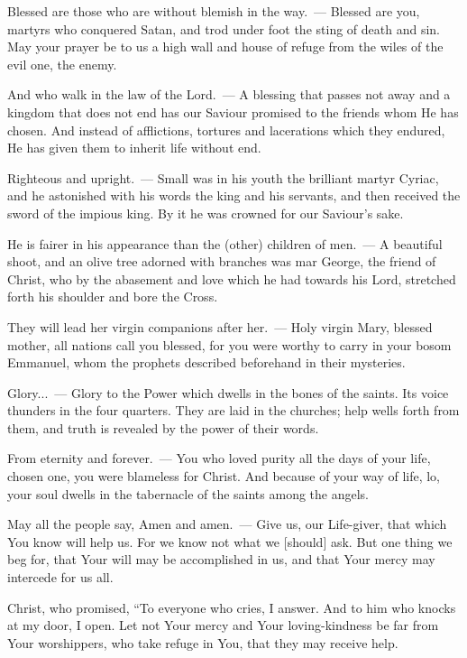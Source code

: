 \documentclass[12pt,twoside,a5paper]{article}
\begin{document}
\begin{halfparskip}
  Blessed are those who are without blemish in the way.~--- Blessed are you, martyrs who conquered Satan, and trod under foot the sting of death and sin. May your prayer be to us a high wall and house of refuge from the wiles of the evil one, the enemy.

  And who walk in the law of the Lord.~--- A blessing that passes not away and a kingdom that does not end has our Saviour promised to the friends whom He has chosen. And instead of afflictions, tortures and lacerations which they endured, He has given them to inherit life without end.

  Righteous and upright.~--- Small was in his youth the brilliant martyr Cyriac, and he astonished with his words the king and his servants, and then received the sword of the impious king. By it he was crowned for our Saviour's sake.

  He is fairer in his appearance than the (other) children of men.~--- A beautiful shoot, and an olive tree adorned with branches was mar George, the friend of Christ, who by the abasement and love which he had towards his Lord, stretched forth his shoulder and bore the Cross.

  They will lead her virgin companions after her.~--- Holy virgin Mary, blessed mother, all nations call you blessed, for you were worthy to carry in your bosom Emmanuel, whom the prophets described beforehand in their mysteries.

  Glory...~--- Glory to the Power which dwells in the bones of the saints. Its voice thunders in the four quarters. They are laid in the churches; help wells forth from them, and truth is revealed by the power of their words.

  From eternity and forever.~--- You who loved purity all the days of your life, chosen one, you were blameless for Christ. And because of your way of life, lo, your soul dwells in the tabernacle of the saints among the angels.

  May all the people say, Amen and amen.~--- Give us, our Life-giver, that which You know will help us. For we know not what we [should] ask. But one thing we beg for, that Your will may be accomplished in us, and that Your mercy may intercede for us all.

  Christ, who promised, ``To everyone who cries, I answer. And to him who knocks at my door, I open. Let not Your mercy and Your loving-kindness be far from Your worshippers, who take refuge in You, that they may receive help.
\end{halfparskip}
\end{document}
